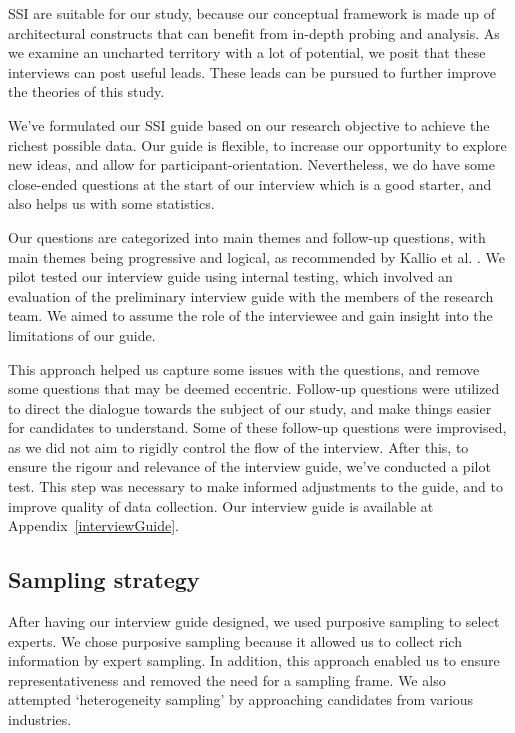 \documentclass{bmcart}
\begin{document}
SSI are suitable for our study, because our conceptual framework is made up of architectural constructs that can benefit from in-depth probing and analysis. As we examine an uncharted territory with a lot of potential, we posit that these interviews can post useful leads. These leads can be pursued to further improve the theories of this study.

 We've formulated our SSI guide based on our research objective to achieve the richest possible data. Our guide is flexible, to increase our opportunity to explore new ideas, and allow for participant-orientation. Nevertheless, we do have some close-ended questions at the start of our interview which is a good starter, and also helps us with some statistics. 

Our questions are categorized into main themes and follow-up questions, with main themes being progressive and logical, as recommended by Kallio et al. \cite{kallio2016systematic}. We pilot tested our interview guide using internal testing, which involved an evaluation of the preliminary interview guide with the members of the research team. We aimed to assume the role of the interviewee and gain insight into the limitations of our guide.

This approach helped us capture some issues with the questions, and remove some questions that may be deemed eccentric. Follow-up questions were utilized to direct the dialogue towards the subject of our study, and make things easier for candidates to understand. Some of these follow-up questions were improvised, as we did not aim to rigidly control the flow of the interview. After this, to ensure the rigour and relevance of the interview guide, we've conducted a pilot test. This step was necessary to make informed adjustments to the guide, and to improve quality of data collection. Our interview guide is available at Appendix~\ref{interviewGuide}.


\subsection{Sampling strategy}

After having our interview guide designed, we used purposive sampling \cite{baltes2022sampling} to select experts. We chose purposive sampling because it allowed us to collect rich information by expert sampling. In addition, this approach enabled us to ensure representativeness and removed the need for a sampling frame. We also attempted `heterogeneity sampling' by approaching candidates from various industries. 
\end{document}
